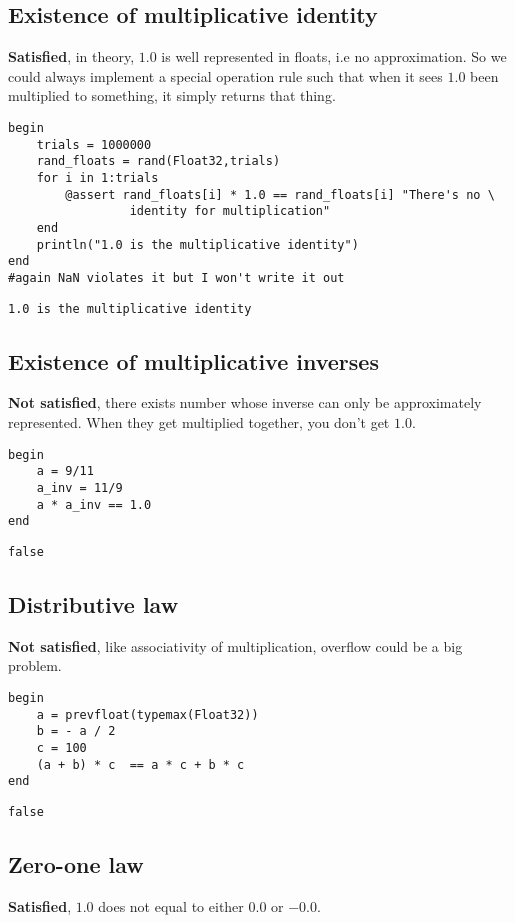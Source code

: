 \documentclass[11pt]{article}
\begin{document}
\subsection{Existence of multiplicative identity}
\label{sec:org1b88cdf}
\textbf{Satisfied}, in theory, \(1.0\) is well represented in floats, i.e no
approximation. So we could always implement a special operation rule such that
when it sees \(1.0\) been multiplied to something, it simply returns that thing.

\begin{verbatim}
begin
    trials = 1000000
    rand_floats = rand(Float32,trials)
    for i in 1:trials
        @assert rand_floats[i] * 1.0 == rand_floats[i] "There's no \
                 identity for multiplication"
    end
    println("1.0 is the multiplicative identity")
end
#again NaN violates it but I won't write it out
\end{verbatim}

\begin{verbatim}
1.0 is the multiplicative identity
\end{verbatim}

\subsection{Existence of multiplicative inverses}
\label{sec:org1f4123e}
\textbf{Not satisfied}, there exists number whose inverse can only be approximately
represented. When they get multiplied together, you don't get \(1.0\).

\begin{verbatim}
begin
    a = 9/11
    a_inv = 11/9
    a * a_inv == 1.0
end
\end{verbatim}

\begin{verbatim}
false
\end{verbatim}

\subsection{Distributive law}
\label{sec:org6f19020}
\textbf{Not satisfied}, like associativity of multiplication, overflow could be a big
problem.

\begin{verbatim}
begin
    a = prevfloat(typemax(Float32))
    b = - a / 2
    c = 100
    (a + b) * c  == a * c + b * c
end
\end{verbatim}

\begin{verbatim}
false
\end{verbatim}

\subsection{Zero-one law}
\label{sec:org231fed0}
\textbf{Satisfied}, \(1.0\) does not equal to either \(0.0\) or \(-0.0\).
\end{document}
